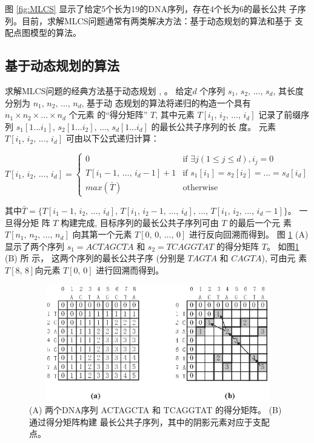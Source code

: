 图 \ref{fig:MLCS} 显示了给定5个长为19的DNA序列，存在4个长为6的最长公共
子序列。目前，求解MLCS问题通常有两类解决方法：基于动态规划的算法和基于
支配点图模型的算法。

\subsection{基于动态规划的算法}

求解MLCS问题的经典方法基于动态规划 \cite{Smith1981}, \cite{Sankoff1972}。 给定$d$
个序列 $s_1,\, s_2,\,...,\, s_d$, 其长度分别为 $n_1,\, n_2,\, ...,\, n_d$, 基于动
态规划的算法将递归的构造一个具有 $n_1 \times n_2 \times ... \times n_d$ 个元素
的“得分矩阵” $T$, 其中元素 $T[i_1,\, i_2,\, ...,\, i_d]$ 记录了前缀序
列 $s_1[1...i_1]$, $s_2[1...i_2]$, ..., $s_d[1...i_d]$ 的最长公共子序列的长
度。 元素 $T[i_1,\, i_2,\, ...,\, i_d]$ 可由以下公式递归计算：

\begin{equation}
  T[i_1,\, i_2,\, ...,\, i_d] =
  \begin{cases}
    0 & \text{if $\exists j(1 \leq j \leq d), i_j = 0$}\\
    T[i_1-1,\, ...,\, i_d-1] + 1  & \text{if $s_1[i_1] = s_2[i_2] =
      ... = s_d[i_d]$}\\
    max(\bar{T}) & \text{otherwise}
  \end{cases}
\end{equation}

其中$\bar{T} = \{T[i_1-1,\, i_2,\, ...,\, i_d],\, T[i_1,\, i_2-1,\,
...,\, i_d],\, ...,\, T[i_1,\, i_2,\, ...,\, i_d-1]\}$。 一旦得分矩
阵 $T$ 构建完成, 目标序列的最长公共子序列可由 $T$ 的最后一个元
素 $T[n_1,\, n_2,\, ...,\, n_d]$ 向其第一个元素 $T[0,\, 0,\, ...,\,
0]$ 进行反向回溯而得到。 图 \ref{fig:DM} (A) 显示了两个序列 $s_1 =
ACTAGCTA$ 和 $s_2 = TCAGGTAT$ 的得分矩阵 $T$。 如图\ref{fig:DM} (B) 所
示， 这两个序列的最长公共子序 (分别是 $TAGTA$ 和 $CAGTA$), 可由元
素 $T[8,\, 8]$向元素 $T[0,\, 0]$ 进行回溯而得到。

\begin{figure}[!h]
  \centering
  \includegraphics[height=2in, width=4.5in]{figures/1_Introduction/score_table}
  \vspace{1em}
  \caption{(A) 两个DNA序列 ACTAGCTA 和 TCAGGTAT 的得分矩阵。 (B) 通过得分矩阵构建
    最长公共子序列，其中的阴影元素对应于支配点。}
\label{fig:DM}
\end{figure}


